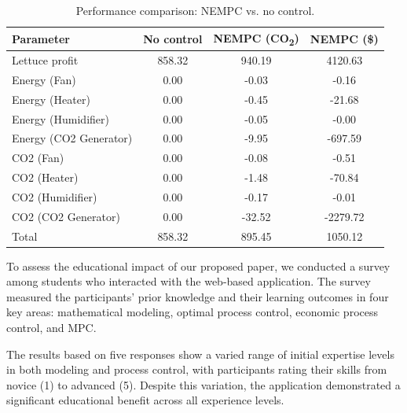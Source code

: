 \documentclass[conference]{IEEEtran}
\begin{document}
\begin{table}
    \centering
    \caption{Performance comparison: NEMPC {vs. } no control.}\label{tab:comparison}
    \begin{tabular}{lS[table-format=4.2]S[table-format=4.2]S[table-format=4.2]}
        \toprule
        Parameter              & {No control} & {NEMPC (CO\textsubscript{2})} & {NEMPC (\$)} \\
        \midrule
        Lettuce profit         & 858.32       & 940.19                        & 4120.63      \\
        Energy (Fan)           & 0.00         & -0.03                         & -0.16        \\
        Energy (Heater)        & 0.00         & -0.45                         & -21.68       \\
        Energy (Humidifier)    & 0.00         & -0.05                         & -0.00        \\
        Energy (CO2 Generator) & 0.00         & -9.95                         & -697.59      \\
        CO2 (Fan)              & 0.00         & -0.08                         & -0.51        \\
        CO2 (Heater)           & 0.00         & -1.48                         & -70.84       \\
        CO2 (Humidifier)       & 0.00         & -0.17                         & -0.01        \\
        CO2 (CO2 Generator)    & 0.00         & -32.52                        & -2279.72     \\
        \midrule
        Total                  & 858.32       & 895.45                        & 1050.12      \\
        \bottomrule
    \end{tabular}
\end{table}

To assess the educational impact of our proposed paper, we conducted a survey among students who interacted with the web-based application. The survey measured the participants' prior knowledge and their learning outcomes in four key areas: mathematical modeling, optimal process control, economic process control, and MPC.\@

The results based on five responses show a varied range of initial expertise levels in both modeling and process control, with participants rating their skills from novice (1) to advanced (5). Despite this variation, the application demonstrated a significant educational benefit across all experience levels.
\end{document}
